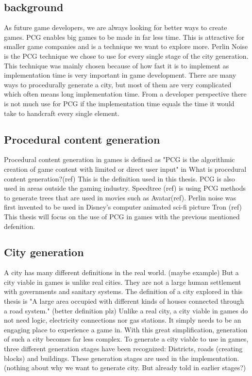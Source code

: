 \subsection{background}
As future game developers, we are always looking for better ways to create games. PCG enables big games to be made in far less time. This is attractive for smaller game companies and is a technique we want to explore more.
Perlin Noise is the PCG technique we chose to use for every single stage of the city generation. This technique was mainly chosen because of how fast it is to implement as implementation time is very important in game development.
There are many ways to procedurally generate a city, but most of them are very complicated which often means long implementation time. From a developer perspective there is not much use for PCG if the implementation time equals the time it would take to handcraft every single element. 

\subsection{Procedural content generation}
Procedural content generation in games is defined as "PCG is the algorithmic creation of game content with limited or direct user input" in What is procedural content generation?(ref) This is the definition used in this thesis.
PCG is also used in areas outside the gaming industry. Speedtree (ref) is using PCG methods to generate trees that are used in movies such as Avatar(ref). Perlin noise was first invented to be used in Disney's computer animated sci-fi picture Tron (ref)
This thesis will focus on the use of PCG in games with the previous mentioned defenition.

\subsection{City generation}
A city has many different definitions in the real world. (maybe example) But a city viable in games is unlike real cities. They are not a large human settlement with governments and sanitary systems. The definition of a city explored in this thesis is "A large area occupied with different kinds of houses connected through a road system." (better definition plz)
Unlike a real city, a city viable in games do not need logic, electricity connections nor gas stations. It simply needs to be an engaging place to experience a game in. With this great simplification, generation of such a city becomes far less complex.
To generate a city viable to use in games, three different generation stages have been recognized: Districts, roads (creating blocks) and buildings. These generation stages are used in the implementation. (nothing about why we want to generate city. But already told in earlier stages?)

